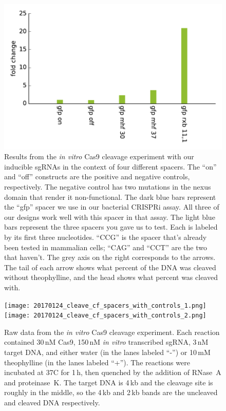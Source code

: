 \documentclass{article}
\begin{document}
\begin{figure}[h!]
 \includegraphics[width=\textwidth]{in_vitro_fold_change.pdf}
 \caption{Results from the \emph{in vitro} Cas9 cleavage experiment with our 
 inducible sgRNAs in the context of four different spacers.  The ``on'' and 
 ``off'' constructs are the positive and negative controls, respectively.  The 
 negative control has two mutations in the nexus domain that render it 
 non-functional.  The dark blue bars represent the ``gfp'' spacer we use in our 
 bacterial CRISPRi assay.  All three of our designs work well with this spacer 
 in that assay.  The light blue bars represent the three spacers you gave us to 
 test.  Each is labeled by its first three nucleotides.  ``CCG'' is the spacer 
 that's already been tested in mammalian cells; ``CAG'' and ``CCT'' are the two 
 that haven't.  The grey axis on the right corresponds to the arrows.  The tail 
 of each arrow shows what percent of the DNA was cleaved without theophylline, 
 and the head shows what percent was cleaved with.}
\end{figure}

\begin{figure}[h!]
 \texttt{[image: 20170124\_cleave\_cf\_spacers\_with\_controls\_1.png]}
 \texttt{[image: 20170124\_cleave\_cf\_spacers\_with\_controls\_2.png]}
 \caption{Raw data from the \emph{in vitro} Cas9 cleavage experiment.  Each 
 reaction contained 30\,nM Cas9, 150\,nM \emph{in vitro} transcribed sgRNA, 
 3\,nM target DNA, and either water (in the lanes labeled ``-'') or 10\,mM 
 theophylline (in the lanes labeled ``+'').  The reactions were incubated at 
 37\degree{}C for 1\,h, then quenched by the addition of RNase~A and 
 proteinase~K.  The target DNA is 4\,kb and the cleavage site is  roughly in 
 the middle, so the 4\,kb and 2\,kb bands are the uncleaved and cleaved DNA 
 respectively.}
\end{figure}
\end{document}
